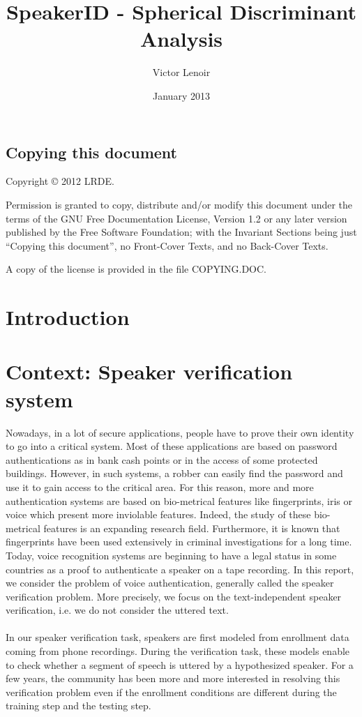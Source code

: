 \documentclass{techrep}
\title{SpeakerID - Spherical Discriminant Analysis}
\author{Victor Lenoir} \revision$LastChangedRevision: 2340 $
\date{January 2013} \email{lenoir@lrde.epita.fr}
\begin{document}
\section*{Copying this document}
Copyright \copyright{} 2012 LRDE.

Permission is granted to copy, distribute and/or modify this document
under the terms of the GNU Free Documentation License, Version 1.2 or
any later version published by the Free Software Foundation; with the
Invariant Sections being just ``Copying this document'', no
Front-Cover Texts, and no Back-Cover Texts.

A copy of the license is provided in the file COPYING.DOC.

\tableofcontents

\newpage

\chapter*{Introduction}
\chapter{Context: Speaker verification system}

Nowadays, in a lot of secure applications, people have to prove their
own identity to go into a critical system. Most of these applications
are based on password authentications as in bank cash points or in the
access of some protected buildings. However, in such systems, a robber
can easily find the password and use it to gain access to the critical
area. For this reason, more and more authentication systems are based
on bio-metrical features like fingerprints, iris or voice which present
more inviolable features. Indeed, the study of these bio-metrical
features is an expanding research field. Furthermore, it is known that
fingerprints have been used extensively in criminal investigations for
a long time. Today, voice recognition systems are beginning to have a
legal status in some countries as a proof to authenticate a speaker on
a tape recording.  In this report, we consider the problem of voice
authentication, generally called the speaker verification
problem. More precisely, we focus on the text-independent speaker
verification, i.e. we do not consider the uttered text.\\\\ In our
speaker verification task, speakers are first modeled from enrollment
data coming from phone recordings. During the verification task, these
models enable to check whether a segment of speech is uttered by a
hypothesized speaker. For a few years, the community has been more and
more interested in resolving this verification problem even if the
enrollment conditions are different during the training step and the
testing step.
\end{document}
